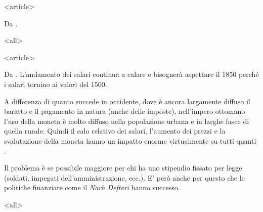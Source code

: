\mode
<article>

Da \cite[p. 13-14]{barkan1975}.

\mode
<all>


\mode
<article>

Da  \cite[p.  306]{ozmucur2002}.   L'andamento dei  salari  continua a
calare e bisognerà aspettare il 1850 perché i salari tornino ai valori
del 1500.

A differenza di quanto succede  in occidente, dove è ancora largamente
diffuso il  baratto e  il pagamento in  natura (anche  delle imposte),
nell'impero  ottomano  l'uso  della   moneta  è  molto  diffuso  nella
popolazione urbana e in larghe  fasce di quella rurale. Quindi il calo
relativo  dei salari,  l'aumento dei  prezzi e  la  svalutazione della
moneta  hanno   un  impatto   enorme  virtualmente  su   tutti  quanti
\cite[p. 307-8]{ozmucur2002}.

Il problema è  se possibile maggiore per chi  ha uno stipendio fissato
per  legge  (soldati, impegati  dell'amministrazione,  ecc.). E'  però
anche  per  questo che  le  politiche  finanziare  come il  {\it  Narh
  Defteri} hanno successo.

\mode
<all>


